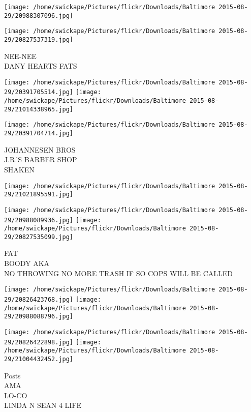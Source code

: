 \documentclass[10pt,letterpaper]{article}
\begin{document}
\texttt{[image: /home/swickape/Pictures/flickr/Downloads/Baltimore 2015-08-29/20988307096.jpg]}

\vspace{0.25in}
\texttt{[image: /home/swickape/Pictures/flickr/Downloads/Baltimore 2015-08-29/20827537319.jpg]}

NEE{-}NEE\\
DANY HEARTS FATS\\
\pagebreak

\texttt{[image: /home/swickape/Pictures/flickr/Downloads/Baltimore 2015-08-29/20391705514.jpg]}
\texttt{[image: /home/swickape/Pictures/flickr/Downloads/Baltimore 2015-08-29/21014338965.jpg]}

\texttt{[image: /home/swickape/Pictures/flickr/Downloads/Baltimore 2015-08-29/20391704714.jpg]}

JOHANNESEN BROS\\
J.R.'S BARBER SHOP\\
SHAKEN\\
\pagebreak

\texttt{[image: /home/swickape/Pictures/flickr/Downloads/Baltimore 2015-08-29/21021895591.jpg]}

\vspace{0.25in}
\texttt{[image: /home/swickape/Pictures/flickr/Downloads/Baltimore 2015-08-29/20988089936.jpg]}
\texttt{[image: /home/swickape/Pictures/flickr/Downloads/Baltimore 2015-08-29/20827535099.jpg]}

FAT\\
BOODY AKA\\
NO THROWING NO MORE TRASH IF SO COPS WILL BE CALLED\\
\pagebreak

\texttt{[image: /home/swickape/Pictures/flickr/Downloads/Baltimore 2015-08-29/20826423768.jpg]}
\texttt{[image: /home/swickape/Pictures/flickr/Downloads/Baltimore 2015-08-29/20988088796.jpg]}

\texttt{[image: /home/swickape/Pictures/flickr/Downloads/Baltimore 2015-08-29/20826422898.jpg]}
\texttt{[image: /home/swickape/Pictures/flickr/Downloads/Baltimore 2015-08-29/21004432452.jpg]}

Posts\\
AMA\\
LO{-}CO\\
LINDA N SEAN 4 LIFE\\
\pagebreak
\end{document}
